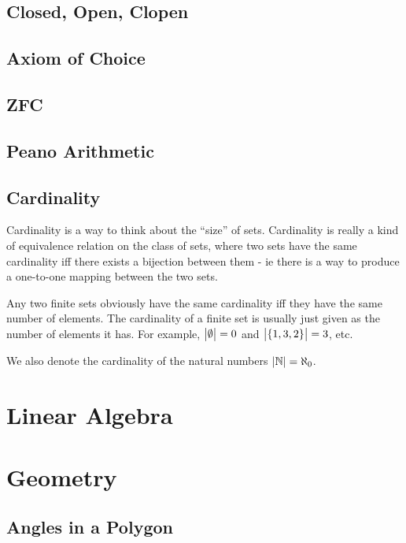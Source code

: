 \documentclass[fleqn,a4paper,11pt]{article}
\begin{document}
    \subsection{Closed, Open, Clopen}

    \subsection{Axiom of Choice}

    \subsection{ZFC}

    \subsection{Peano Arithmetic}

    \subsection{Cardinality}


    Cardinality is a way to think about the ``size'' of sets. Cardinality is
    really a kind of equivalence relation on the class of sets, where two sets
    have the same cardinality iff there exists a bijection between them - ie
    there is a way to produce a one-to-one mapping between the two sets.

    Any two finite sets obviously have the same cardinality iff they have the
    same number of elements. The cardinality of a finite set is usually just
    given as the number of elements it has. For example, \(\abs{\emptyset} = 0\)
    and \(\abs{\set{1, 3, 2}} = 3\), etc.

    We also denote the cardinality of the natural numbers
    \(\abs{\mathbb{N}} = \aleph_0\).

    \section{Linear Algebra}

    \section{Geometry}

    \subsection{Angles in a Polygon} \label{sec_geom_polygon_angles}
\end{document}
